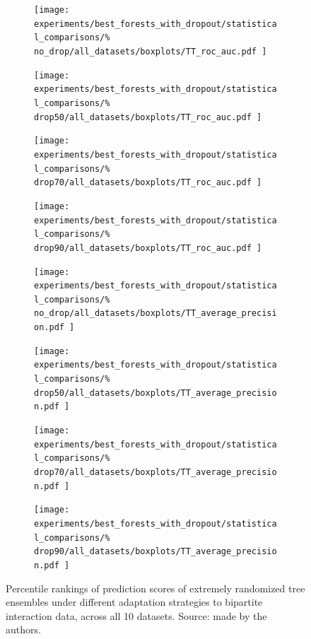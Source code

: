 \begin{figure}[tbh]
    \begin{subfigure}{0.24\textwidth}
        \texttt{[image: 
            experiments/best\_forests\_with\_dropout/statistical\_comparisons/\%
            no\_drop/all\_datasets/boxplots/TT\_roc\_auc.pdf
        ]}
    \end{subfigure}
    \begin{subfigure}{0.24\textwidth}
        \texttt{[image: 
            experiments/best\_forests\_with\_dropout/statistical\_comparisons/\%
            drop50/all\_datasets/boxplots/TT\_roc\_auc.pdf
        ]}
    \end{subfigure}
    \begin{subfigure}{0.24\textwidth}
        \texttt{[image: 
            experiments/best\_forests\_with\_dropout/statistical\_comparisons/\%
            drop70/all\_datasets/boxplots/TT\_roc\_auc.pdf
        ]}
    \end{subfigure}
    \begin{subfigure}{0.24\textwidth}
        \texttt{[image: 
            experiments/best\_forests\_with\_dropout/statistical\_comparisons/\%
            drop90/all\_datasets/boxplots/TT\_roc\_auc.pdf
        ]}
    \end{subfigure}

    \begin{subfigure}{0.24\textwidth}
        \texttt{[image: 
            experiments/best\_forests\_with\_dropout/statistical\_comparisons/\%
            no\_drop/all\_datasets/boxplots/TT\_average\_precision.pdf
        ]}
    \end{subfigure}
    \begin{subfigure}{0.24\textwidth}
        \texttt{[image: 
            experiments/best\_forests\_with\_dropout/statistical\_comparisons/\%
            drop50/all\_datasets/boxplots/TT\_average\_precision.pdf
        ]}
    \end{subfigure}
    \begin{subfigure}{0.24\textwidth}
        \texttt{[image: 
            experiments/best\_forests\_with\_dropout/statistical\_comparisons/\%
            drop70/all\_datasets/boxplots/TT\_average\_precision.pdf
        ]}
    \end{subfigure}
    \begin{subfigure}{0.24\textwidth}
        \texttt{[image: 
            experiments/best\_forests\_with\_dropout/statistical\_comparisons/\%
            drop90/all\_datasets/boxplots/TT\_average\_precision.pdf
        ]}
    \end{subfigure}
    \caption{
        Percentile rankings of prediction scores of extremely randomized tree ensembles under different adaptation strategies to bipartite interaction data, across all 10 datasets. Source: made by the authors.
    }
    \label{fig:best_forests}
\end{figure}


